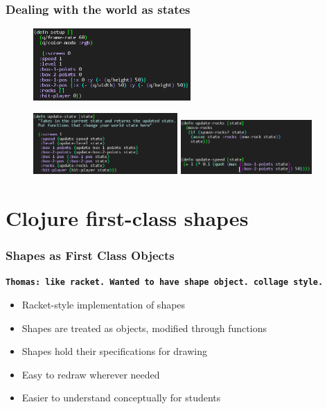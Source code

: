 \documentclass{beamer}
\newcommand{\comment}[1]{{\bf \tt  {#1}}}
\newcommand{\thcomment}[1]{\textcolor{BestBlue}{\comment{Thomas: {#1}}}}
\begin{document}
\begin{frame}
\frametitle{Dealing with the world as states}
	\begin{figure}
		\includegraphics[width=6cm]{PresentationImages/setupCode.png}
	\end{figure}
	\begin{figure}
		\includegraphics[width=5.5cm]{PresentationImages/updateCode.png}
		\hspace{0.1cm}
		\includegraphics[width=5cm]{PresentationImages/updateFunctionsCode.png}
	\end{figure}
\end{frame}


\section{Clojure first-class shapes}

\begin{frame}
\frametitle{Shapes as First Class Objects}
\thcomment{like racket. Wanted to have shape object. collage style.}
	\begin{itemize}
		\item Racket-style implementation of shapes
		\item Shapes are treated as objects, modified through functions
		\item Shapes hold their specifications for drawing
		\item Easy to redraw wherever needed
		\item Easier to understand conceptually for students
	\end{itemize}
\end{frame}
\end{document}
